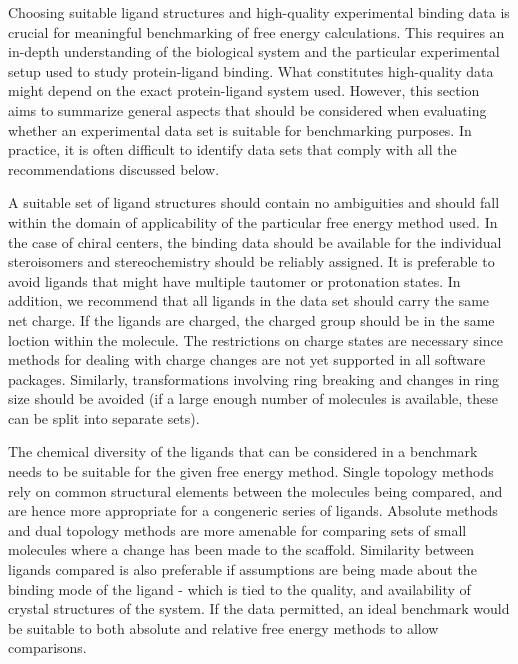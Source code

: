\documentclass[9pt,bestpractices]{livecoms}
\begin{document}
Choosing suitable ligand structures and high-quality experimental binding data is crucial for  meaningful benchmarking of free energy calculations. This requires an in-depth understanding of the biological system and the particular experimental setup used to study protein-ligand binding. What constitutes high-quality data might depend on the exact protein-ligand system used. However, this section aims to summarize general aspects that should be considered when evaluating whether an experimental data set is suitable for benchmarking purposes. In practice, it is often difficult to identify data sets that comply with all the recommendations discussed below.

A suitable set of ligand structures should contain no ambiguities and should fall within the domain of applicability of the particular free energy method used. In the case of chiral centers, the binding data should be available for the individual steroisomers and stereochemistry should be reliably assigned. It is preferable to avoid ligands that might have multiple tautomer or protonation states. In addition, we recommend that all ligands in the data set should carry the same net charge. If the ligands are charged, the charged group should be in the same loction within the molecule. The restrictions on charge states are necessary since methods for dealing with charge changes are not yet supported in all software packages. Similarly, transformations involving ring breaking and changes in ring size should be avoided (if a large enough number of molecules is available, these can be split into separate sets).

The chemical diversity of the ligands that can be considered in a benchmark needs to be suitable for the given free energy method. Single topology methods rely on common structural elements between the molecules being compared, and are hence more appropriate for a congeneric series of ligands. Absolute methods and dual topology methods are more amenable for comparing sets of small molecules where a change has been made to the scaffold. Similarity between ligands compared is also preferable if assumptions are being made about the binding mode of the ligand - which is tied to the quality, and availability of crystal structures of the system. If the data permitted, an ideal benchmark would be suitable to both absolute and relative free energy methods to allow comparisons.
\end{document}
